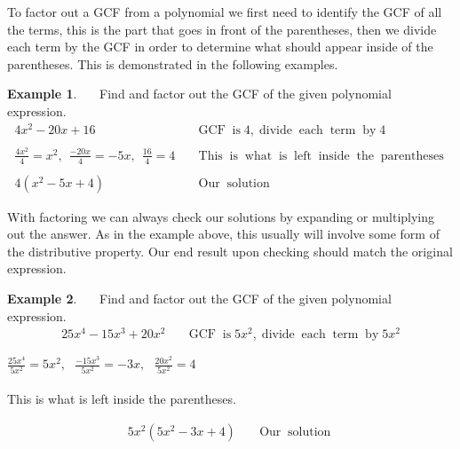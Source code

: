 \documentclass[12pt]{book}
\theoremstyle{definition}
\newtheorem{example}{Example}
\newcommand{\tmop}[1]{\ensuremath{\operatorname{#1}}}
\begin{document}
To factor out a GCF from a polynomial we first need to identify the GCF of all the terms, this is the part that goes in front of the parentheses, then we divide each term by the GCF in order to determine what should appear inside of the parentheses. This is demonstrated in the following examples.

\begin{example}~~~Find and factor out the GCF of the given polynomial expression.
  \begin{eqnarray*}
    4 x^2 - 20 x + 16 &  & \tmop{GCF} \tmop{is} 4, \tmop{divide} \tmop{each}
    \tmop{term} \tmop{by} 4\\
		&&\\
    \frac{4 x^2}{4} = x^2,~~ \frac{- 20 x}{4} = - 5 x,~~ \frac{16}{4} = 4 &  &
    \tmop{This} \tmop{is} \tmop{what} \tmop{is} \tmop{left} \tmop{inside}
    \tmop{the} \tmop{parentheses}\\
    &&\\
    4 (x^2 - 5 x + 4) &  & \tmop{Our} \tmop{solution}
  \end{eqnarray*}
\end{example}

With factoring we can always check our solutions by expanding or multiplying out the answer.  As in the example above, this usually will involve some form of the distributive property.  Our end result upon checking should match the original expression.

\begin{example}~~~Find and factor out the GCF of the given polynomial expression.
   \begin{eqnarray*}
    25 x^4 - 15 x^3 + 20 x^2 &  & \tmop{GCF} \tmop{is} 5 x^2, \tmop{divide}
    \tmop{each} \tmop{term} \tmop{by} 5x^2%
    \end{eqnarray*}
		\begin{center}
		$\displaystyle\frac{25 x^4}{5 x^2} = 5 x^2,~~~ \displaystyle\frac{- 15 x^3}{5 x^2} = - 3 x,~~~ \displaystyle\frac{20
    x^2}{5 x^2} = 4$\\
		~\\
		This is what is left inside the parentheses.
		\end{center}
    \begin{eqnarray*}
    5 x^2 (5 x^2 - 3 x + 4) &  & \tmop{Our} \tmop{solution}
  \end{eqnarray*}
\end{example}
	
\end{document}

